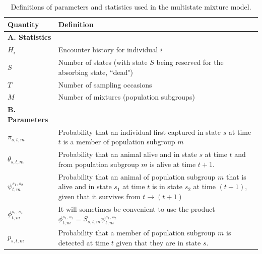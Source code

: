 \documentclass[times,mee,doublespace,]{besauth2}
\begin{document}
\pagebreak
\begin{table}[ht]
\caption{Definitions of parameters and statistics used in the multistate mixture model.
}
\label{tab:notation}
\raggedright
\begin{tabular}{p{2cm}p{13cm}}
  \hline
   Quantity & Definition \\
  \hline
   \textbf{A. Statistics}  &   \\
  $H_i$ & Encounter history for individual $i$ \\
  $S$ & Number of states (with state $S$ being reserved for the absorbing state, ``dead") \\
  $T$ & Number of sampling occasions \\
  $M$ & Number of mixtures (population subgroups) \\
  \textbf{B. Parameters } & \\
  $\pi_{s,t,m}$ & Probability that an individual first captured in state $s$ at time $t$ is a member of population subgroup $m$ \\
  $\theta_{s,t,m}$ & Probability that an animal alive and in state $s$ at time $t$ and from population subgroup $m$ is alive at time $t+1$. \\
  $\psi_{t,m}^{s_1,s_2}$ & Probability that an animal of population subgroup $m$ that is alive and in state $s_1$ at time $t$ is in state $s_2$ at time $(t+1)$, given that it survives from $t \rightarrow (t+1)$ \\
  $\phi_{t,m}^{s_1,s_2}$ & It will sometimes be convenient to use the product $\phi_{t,m}^{s_1,s_2} = S_{s,t,m} \psi_{t,m}^{s_1,s_2}$ \\
  $p_{s,t,m}$ & Probability that a member of population subgroup $m$ is detected at time $t$ given that they are in state $s$.  \\
\hline
\end{tabular}
\\
\end{table}
\end{document}
